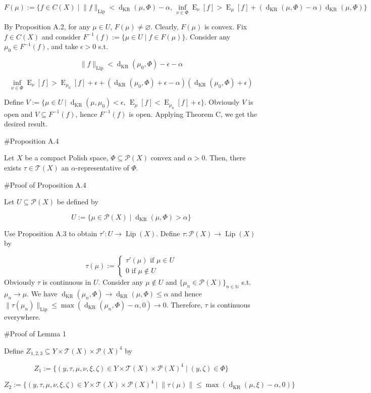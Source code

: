 \documentclass[a4paper]{article}
\DeclareMathOperator{\E}{E}
\newcommand{\Nats}{\mathbb{N}}
\newcommand{\Sq}[2]{\{#1\}_{#2 \in \Nats}}
\newcommand{\Sqn}[1]{\Sq{#1}{n}}
\newcommand{\Norm}[1]{\lVert #1 \rVert}
\newcommand{\Prob}{\mathcal{P}}
\newcommand{\T}{\mathcal{T}}
\newcommand{\Lip}{\operatorname{Lip}}
\newcommand{\NormL}[1]{\Norm{#1}_{\operatorname{Lip}}}
\newcommand{\Dkr}{\operatorname{d}_{\text{KR}}}
\begin{document}
$$F(\mu):=\{f \in C(X) \mid \NormL{f} < \Dkr(\mu, \Phi) - \alpha,\, \inf_{\nu \in \Phi} \E_\nu[f] > \E_\mu[f] + (\Dkr(\mu,\Phi) - \alpha) \Dkr(\mu,\Phi)\}$$

By Proposition A.2, for any $\mu \in U$, $F(\mu) \ne \varnothing$. Clearly, $F(\mu)$ is convex. Fix $f \in C(X)$ and consider $F^{-1}(f):=\{\mu \in U \mid f \in F(\mu)\}$. Consider any $\mu_0 \in F^{-1}(f)$, and take $\epsilon > 0$ s.t.

$$\NormL{f} < \Dkr(\mu_0, \Phi)  - \epsilon - \alpha$$

$$\inf_{\nu \in \Phi} \E_\nu[f] > \E_{\mu_0}[f] + \epsilon + (\Dkr(\mu_0,\Phi) + \epsilon  - \alpha) (\Dkr(\mu_0,\Phi) + \epsilon)$$

Define $V := \{\mu \in U \mid \Dkr(\mu,\mu_0) < \epsilon,\, \E_\mu[f] < \E_{\mu_0}[f] + \epsilon\}$. Obviously $V$ is open and $V \subseteq F^{-1}(f)$, hence $F^{-1}(f)$ is open. Applying Theorem C, we get the desired result.

\#Proposition A.4

Let $X$ be a compact Polish space, $\Phi \subseteq \Prob(X)$ convex and $\alpha > 0$. Then, there exists $\tau \in \T(X)$ an $\alpha$-representative of $\Phi$.

\#Proof of Proposition A.4

Let $U \subseteq \Prob(X)$ be defined by

$$U:=\{\mu \in \Prob(X) \mid \Dkr(\mu, \Phi) > \alpha\}$$

Use Proposition A.3 to obtain $\tau': U \rightarrow \Lip(X)$. Define $\tau: \Prob(X) \rightarrow \Lip(X)$ by

$$\tau(\mu):=\begin{cases}\tau'(\mu) \text{ if } \mu \in U\\0 \text { if } \mu \not\in U\end{cases}$$ 
Obviously $\tau$ is continuous in $U$. Consider any $\mu \not\in U$ and $\Sqn{\mu_n \in \Prob(X)}$ s.t. $\mu_n \rightarrow \mu$. We have $\Dkr(\mu_n,\Phi) \rightarrow \Dkr(\mu, \Phi) \leq \alpha$ and hence $\NormL{\tau(\mu_n)} \leq \max(\Dkr(\mu_n,\Phi) - \alpha, 0) \rightarrow 0$. Therefore, $\tau$ is continuous everywhere.

\#Proof of Lemma 1

Define $Z_{1,2,3} \subseteq Y \times \T(X) \times \Prob(X)^4$ by

$$Z_1:=\{(y,\tau,\mu,\nu,\xi,\zeta) \in Y \times \T(X) \times \Prob(X)^4 \mid (y, \zeta) \in \Phi\}$$

$$Z_2:=\{(y,\tau,\mu,\nu,\xi,\zeta) \in Y \times \T(X) \times \Prob(X)^4 \mid \Norm{\tau(\mu)} \leq \max(\Dkr(\mu,\xi) - \alpha, 0)\}$$
\end{document}
